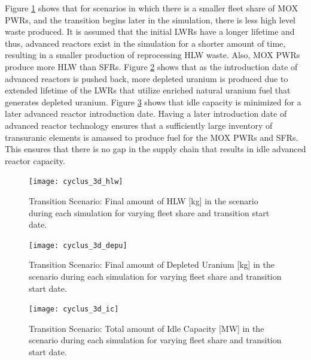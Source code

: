 Figure \ref{fig:cyclus_3d_hlw} shows that for scenarios in which 
there is a smaller fleet share of \gls{MOX} \glspl{PWR}, and the 
transition begins later in the simulation, there is less high 
level waste produced. 
It is assumed that the initial \glspl{LWR} have a longer lifetime
and thus, advanced reactors exist in the simulation for a shorter 
amount of time, resulting in a smaller production of reprocessing 
HLW waste. 
Also, \gls{MOX} \glspl{PWR} produce more \gls{HLW} than \glspl{SFR}. 
Figure \ref{fig:cyclus_3d_depu} shows that as the introduction date 
of advanced reactors is pushed back, more depleted uranium is produced 
due to extended lifetime of the \glspl{LWR} that utilize enriched 
natural uranium fuel that generates depleted uranium. 
Figure \ref{fig:cyclus_3d_ic} shows that idle capacity is minimized 
for a later advanced reactor introduction date. 
Having a later introduction date of advanced reactor technology ensures 
that a sufficiently large inventory of transuranic elements is amassed
to produce fuel for the \gls{MOX} \glspl{PWR} and \glspl{SFR}.  
This ensures that there is no gap in the supply chain that results 
in idle advanced reactor capacity.

\begin{figure}[]
    \centering
    \texttt{[image: cyclus\_3d\_hlw]} 
    \caption{\Cyclus Transition Scenario: Final amount of HLW [kg] in the scenario during each simulation for varying fleet share and transition start date.}
    \label{fig:cyclus_3d_hlw}
\end{figure}

\begin{figure}[]
    \centering
    \texttt{[image: cyclus\_3d\_depu]} 
    \caption{\Cyclus Transition Scenario: Final amount of Depleted Uranium [kg] in the scenario during each simulation for varying fleet share and transition start date.}
    \label{fig:cyclus_3d_depu}
\end{figure}

\begin{figure}[]
    \centering
    \texttt{[image: cyclus\_3d\_ic]} 
    \caption{\Cyclus Transition Scenario: Total amount of Idle Capacity [MW] in the scenario during each simulation for varying fleet share and transition start date.}
    \label{fig:cyclus_3d_ic}
\end{figure}


